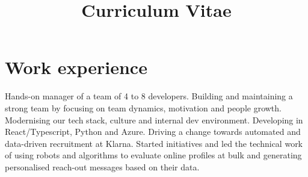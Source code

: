 \documentclass[11pt,a4paper,sans]{moderncv}
\title{Curriculum Vitae}
\begin{document}
\makecvtitle

\section{Work experience}\label{sec:work-experience}
{Hands-on manager of a team of 4 to 8 developers.
Building and maintaining a strong team by focusing on team dynamics, motivation and people growth.
Modernising our tech stack, culture and internal dev environment.
Developing in React/Typescript, Python and Azure.}
{Driving a change towards automated and data-driven recruitment at Klarna.
Started initiatives and led the technical work of using robots and algorithms to evaluate
online profiles at bulk and generating personalised reach-out messages based on their data.
}
{}
\end{document}
